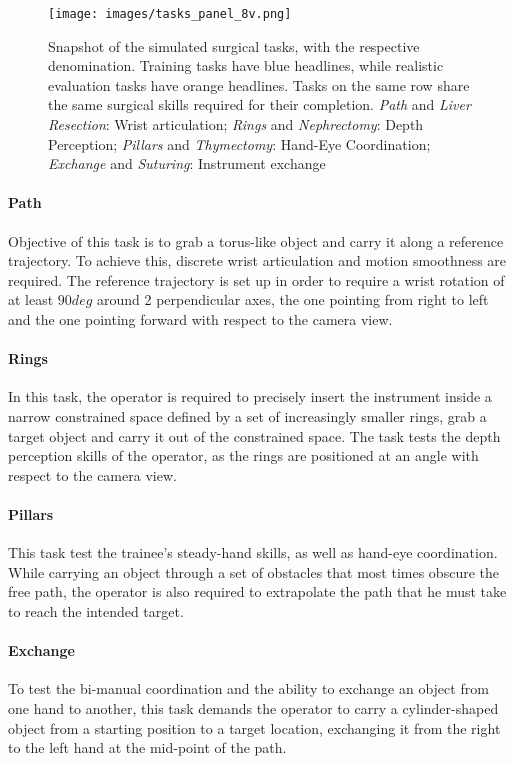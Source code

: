 \documentclass[../main.tex]{subfiles}
\begin{document}
\begin{figure}
    \centering
    \texttt{[image: images/tasks\_panel\_8v.png]}
    \caption{Snapshot of the simulated surgical tasks, with the respective denomination. Training tasks have blue headlines, while realistic evaluation tasks have orange headlines. Tasks on the same row share the same surgical skills required for their completion. \textit{Path} and \textit{Liver Resection}: Wrist articulation; \textit{Rings} and \textit{Nephrectomy}: Depth Perception; \textit{Pillars} and \textit{Thymectomy}: Hand-Eye Coordination; \textit{Exchange} and \textit{Suturing}: Instrument exchange}
    \label{fig:taskspanel}
\end{figure}

\paragraph{Path} Objective of this task is to grab a torus-like object and carry it along a reference trajectory. To achieve this, discrete wrist articulation and motion smoothness are required. The reference trajectory is set up in order to require a wrist rotation of at least $90 \unit{deg}$ around 2 perpendicular axes, the one pointing from right to left and the one pointing forward with respect to the camera view.
\paragraph{Rings} In this task, the operator is required to precisely insert the instrument inside a narrow constrained space defined by a set of increasingly smaller rings, grab a target object and carry it out of the constrained space. The task tests the depth perception skills of the operator, as the rings are positioned at an angle with respect to the camera view.
\paragraph{Pillars} This task test the trainee's steady-hand skills, as well as hand-eye coordination. While carrying an object through a set of obstacles that most times obscure the free path, the operator is also required to extrapolate the path that he must take to reach the intended target.
\paragraph{Exchange} To test the bi-manual coordination and the ability to exchange an object from one hand to another, this task demands the operator to carry a cylinder-shaped object from a starting position to a target location, exchanging it from the right to the left hand at the mid-point of the path. 
\end{document}

